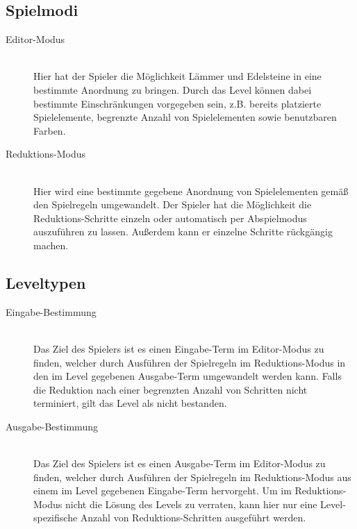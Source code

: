 \subsection{Spielmodi}

\begin{description}
\item[Editor-Modus] \hfill \\ Hier hat der Spieler die Möglichkeit Lämmer und Edelsteine in eine bestimmte Anordnung zu bringen. Durch das Level können dabei bestimmte Einschränkungen vorgegeben sein, z.B. bereits platzierte Spielelemente, begrenzte Anzahl von Spielelementen sowie benutzbaren Farben.
\item[Reduktions-Modus] \hfill \\ Hier wird eine bestimmte gegebene Anordnung von Spielelementen gemäß den Spielregeln umgewandelt. Der Spieler hat die Möglichkeit die Reduktions-Schritte einzeln oder automatisch per Abspielmodus auszuführen zu lassen. Außerdem kann er einzelne Schritte rückgängig machen.
\end{description}

\subsection{Leveltypen}

\begin{description}
\item[Eingabe-Bestimmung] \hfill \\ Das Ziel des Spielers ist es einen Eingabe-Term im Editor-Modus zu finden, welcher durch Ausführen  der Spielregeln im Reduktions-Modus in den im Level gegebenen Ausgabe-Term umgewandelt werden kann. Falls die Reduktion nach einer begrenzten Anzahl von Schritten nicht terminiert, gilt das Level als nicht bestanden.
\item[Ausgabe-Bestimmung] \hfill \\ Das Ziel des Spielers ist es einen Ausgabe-Term im Editor-Modus zu finden, welcher durch Ausführen  der Spielregeln im Reduktions-Modus aus einem im Level gegebenen Eingabe-Term hervorgeht. Um im Reduktions-Modus nicht die Lösung des Levels zu verraten, kann hier nur eine Level-spezifische Anzahl von Reduktions-Schritten ausgeführt werden.
\end{description}